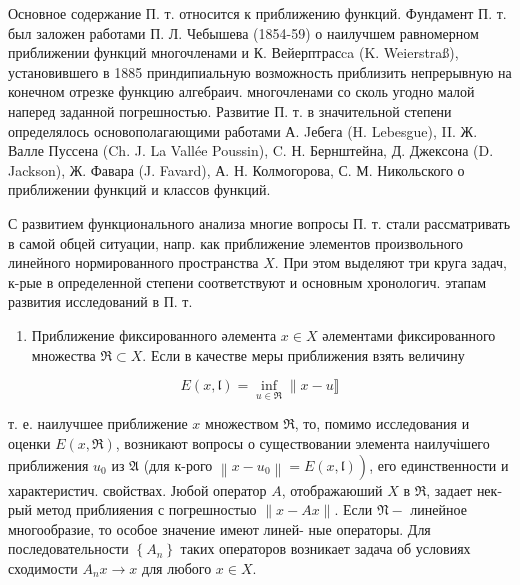\documentclass[10pt]{article}
\begin{document}
Основное содержание П. т. относится к приближению функций. Фундамент П. т. был заложен работами П. Л. Чебышева (1854-59) о наилучшем равномерном приближении функций многочленами и К. Вейерптрасca (K. Weierstraß), установившего в 1885 приндипиальную возможность приблизить непрерывную на конечном отрезке функцию алгебраич. многочленами со сколь угодно малой наперед заданной погрешностью. Развитие П. т. в значительной степени определялось основополагающими работами А. Jебега (H. Lebesgue), II. Ж. Валле Пуссена (Ch. J. La Vallée Poussin), C. Н. Бернштейна, Д. Джексона (D. Jackson), Ж. Фавара (J. Favard), А. Н. Колмогорова, С. М. Никольского о приближении функций и классов функций.



С развитием функционального анализа многие вопросы П. т. стали рассматривать в самой обцей ситуации, напр. как приближение элементов произвольного линейного нормированного пространства $X$. При этом выделяют три круга задач, к-рые в определенной степени соответствуют и основным хронологич. этапам развития исследований в П. т.



\begin{enumerate}

  \item Приближение фиксированного әлемента $x \in X$ әлементами фиксированного множества $\mathfrak{\Re} \subset X$. Если в качестве меры приближения взять величину

\end{enumerate}



\[

E(x, \mathfrak{l})=\inf _{u \in \mathfrak{R}} \| x-u \rrbracket

\]



т. е. наилучшее приближение $x$ множеством $\mathfrak{R}$, то, помимо исследования и оценки $E(x, \mathfrak{R})$, возникают вопросы о существовании элемента наилучішего приближения $u_{0}$ из $\mathfrak{A}$ (для к-рого $\left.\left\|x-u_{0}\right\|=E(x, \mathfrak{l})\right)$, его единственности и характеристич. свойствах. Јюбой оператор $A$, отображаюший $X$ в $\Re$, задает нек-рый метод приблияения с погрешностыо $\|x-A x\|$. Если $\mathfrak{N}-$ линейное многообразие, то особое значение имеют линей- ные операторы. Для последовательности $\left\{A_{n}\right\}$ таких операторов возникает задача об условиях сходимости $A_{n} x \rightarrow x$ для любого $x \in X$.
\end{document}
